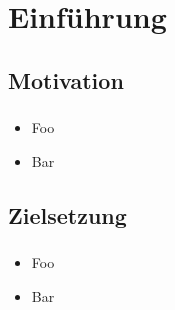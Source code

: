 \section{Einführung}


\subsection{Motivation}

\begin{frame}
    \frametitle{\insertsubsection} 

    \begin{itemize}
        \setlength\itemsep{1em}
        \item Foo
        \item Bar
    \end{itemize}
\end{frame}


\subsection{Zielsetzung}

\begin{frame}
    \frametitle{\insertsubsection} 

    \begin{itemize}
        \setlength\itemsep{1em}
        \item Foo
        \item Bar
    \end{itemize}
\end{frame}
